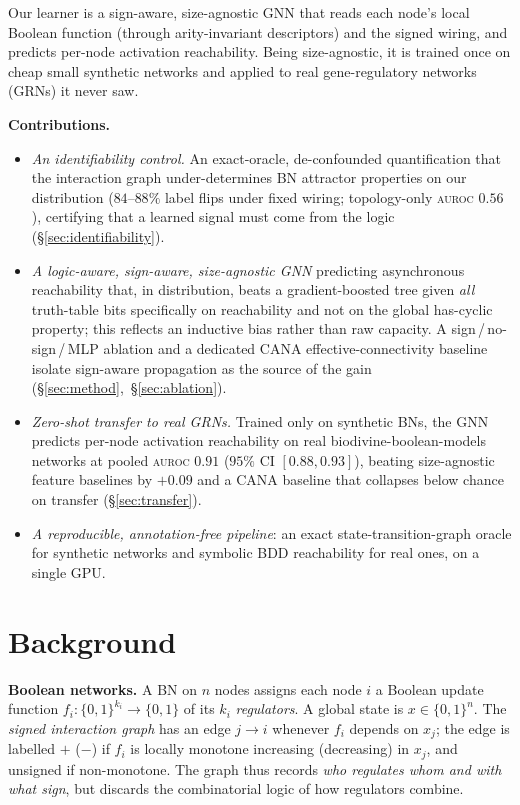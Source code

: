 \documentclass[journal]{IEEEtran}
\newcommand{\auroc}{\textsc{auroc}}
\newcommand{\bz}{\{0,1\}}
\begin{document}
Our learner is a sign-aware, size-agnostic GNN that reads each node's local Boolean
function (through arity-invariant descriptors) and the signed wiring, and predicts
per-node activation reachability. Being size-agnostic, it is trained once on cheap
small synthetic networks and applied to real gene-regulatory networks (GRNs) it never
saw.

\noindent\textbf{Contributions.}
\begin{itemize}
\item \emph{An identifiability control.} An exact-oracle, de-confounded quantification
that the interaction graph under-determines BN attractor properties on our
distribution ($84$--$88\%$ label flips under fixed wiring; topology-only \auroc{}
$0.56$), certifying that a learned signal must come from the logic
(\S\ref{sec:identifiability}).
\item \emph{A logic-aware, sign-aware, size-agnostic GNN} predicting asynchronous
reachability that, in distribution, beats a gradient-boosted tree given \emph{all}
truth-table bits specifically on reachability and not on the global has-cyclic
property; this reflects an inductive bias rather than raw capacity. A sign\,/\,no-sign\,/\,MLP ablation and
a dedicated CANA effective-connectivity baseline isolate sign-aware propagation as the
source of the gain (\S\ref{sec:method},~\S\ref{sec:ablation}).
\item \emph{Zero-shot transfer to real GRNs.} Trained only on synthetic BNs, the GNN
predicts per-node activation reachability on real biodivine-boolean-models networks at
pooled \auroc{} $0.91$ ($95\%$ CI $[0.88,0.93]$), beating size-agnostic feature
baselines by ${+}0.09$ and a CANA baseline that collapses below chance on transfer
(\S\ref{sec:transfer}).
\item \emph{A reproducible, annotation-free pipeline}: an exact state-transition-graph
oracle for synthetic networks and symbolic BDD reachability for real ones, on a single
GPU.
\end{itemize}

\section{Background}
\label{sec:background}
\textbf{Boolean networks.} A BN on $n$ nodes assigns each node $i$ a Boolean update
function $f_i:\bz^{k_i}\!\to\!\bz$ of its $k_i$ \emph{regulators}. A global state is
$x\in\bz^n$. The \emph{signed interaction graph} has an edge $j\!\to\!i$ whenever $f_i$
depends on $x_j$; the edge is labelled $+$ ($-$) if $f_i$ is locally monotone
increasing (decreasing) in $x_j$, and unsigned if non-monotone. The graph thus records
\emph{who regulates whom and with what sign}, but discards the combinatorial logic of
how regulators combine.
\end{document}
